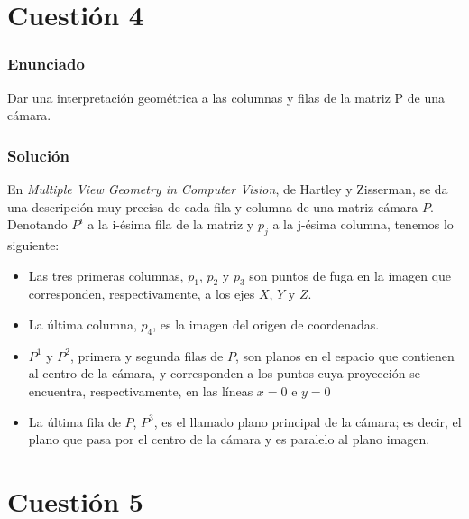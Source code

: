 
\section{Cuestión 4}

\subsubsection{Enunciado}

Dar una interpretación geométrica a las columnas y filas de la matriz P de una cámara.

\subsubsection{Solución}

En \emph{Multiple View Geometry in Computer Vision}, de Hartley y Zisserman, se da una descripción muy precisa de cada fila y columna de una matriz cámara $P$. Denotando $P^i$ a la i-ésima fila de la matriz y $p_j$ a la j-ésima columna, tenemos lo siguiente:

\begin{itemize}
	\item Las tres primeras columnas, $p_1$, $p_2$ y $p_3$ son puntos de fuga en la imagen que corresponden, respectivamente, a los ejes $X$, $Y$ y $Z$. 
	
	\item La última columna, $p_4$, es la imagen del origen de coordenadas.
	
	\item $P^1$ y $P^2$, primera y segunda filas de $P$, son planos en el espacio que contienen al centro de la cámara, y corresponden a los puntos cuya proyección se encuentra, respectivamente, en las líneas $x=0$ e $y=0$
	\item La última fila de $P$, $P^3$, es el llamado plano principal de la cámara; es decir, el plano que pasa por el centro de la cámara y es paralelo al plano imagen.
\end{itemize}


\section{Cuestión 5}

